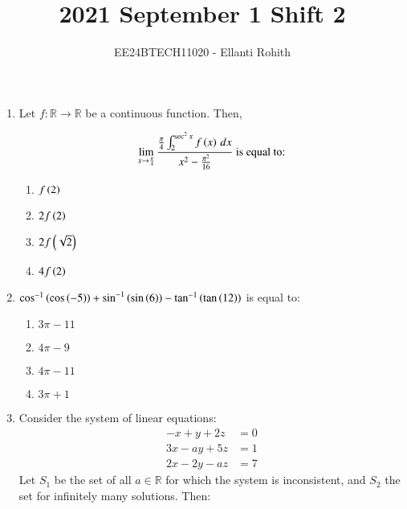 \documentclass[journal,12pt,onecolumn]{IEEEtran}
\theoremstyle{remark}
\begin{document}

\vspace{3cm}

\title{2021 September 1 Shift 2}
\author{EE24BTECH11020 -  Ellanti Rohith}
\maketitle

\renewcommand{\thefigure}{\theenumi}
\renewcommand{\thetable}{\theenumi}



\begin{enumerate}

\item Let $f : \mathbb{R} \to \mathbb{R}$ be a continuous function. Then,

\begin{align*}
\lim_{x \to \frac{\pi}{4}} \frac{\frac{\pi}{4} \int_{2}^{\sec^2 x} f\left(x\right) \, dx}{x^2 - \frac{\pi^2}{16}} \text{  is equal to:}
\end{align*}



\begin{multicols}{4}
\begin{enumerate}
    \item $f\left(2\right)$
    \item $2f\left(2\right)$
    \item $2f\left(\sqrt{2}\right)$
    \item $4f\left(2\right)$
\end{enumerate}
\end{multicols}

\item $\cos^{-1}\left(\cos\left(-5\right)\right) + \sin^{-1}\left(\sin\left(6\right)\right) - \tan^{-1}\left(\tan\left(12\right)\right)$ is equal to:
\begin{multicols}{2}
    \begin{enumerate}
    \item $3\pi - 11$
    \item $4\pi - 9$
    \item $4\pi - 11$
    \item $3\pi + 1$
\end{enumerate}
\end{multicols}


\item Consider the system of linear equations:
\begin{align*}
-x + y + 2z &= 0 \\
3x - ay + 5z &= 1 \\
2x - 2y - az &= 7
\end{align*}
Let $S_1$ be the set of all $a \in \mathbb{R}$ for which the system is inconsistent, and $S_2$ the set for infinitely many solutions. Then:


\end{enumerate}
\end{document}
